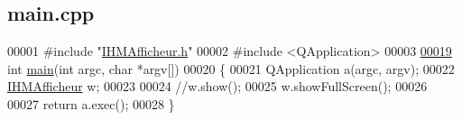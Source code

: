 \hypertarget{main_8cpp_source}{}\subsection{main.\+cpp}

\begin{DoxyCode}
00001 \textcolor{preprocessor}{#include "\hyperlink{_i_h_m_afficheur_8h}{IHMAfficheur.h}"}
00002 \textcolor{preprocessor}{#include <QApplication>}
00003 
\hyperlink{main_8cpp_a0ddf1224851353fc92bfbff6f499fa97}{00019} \textcolor{keywordtype}{int} \hyperlink{main_8cpp_a0ddf1224851353fc92bfbff6f499fa97}{main}(\textcolor{keywordtype}{int} argc, \textcolor{keywordtype}{char} *argv[])
00020 \{
00021     QApplication a(argc, argv);
00022     \hyperlink{class_i_h_m_afficheur}{IHMAfficheur} w;
00023 
00024     \textcolor{comment}{//w.show();}
00025     w.showFullScreen();
00026 
00027     \textcolor{keywordflow}{return} a.exec();
00028 \}
\end{DoxyCode}
